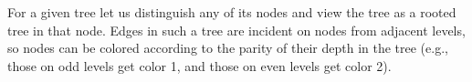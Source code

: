 \subproblem
For a given tree let us distinguish any of its nodes and view the tree as a rooted tree in that node.
Edges in such a tree are incident on nodes from adjacent levels, so nodes can be colored according to the parity of their depth in the tree (e.g., those on odd levels get color 1, and those on even levels get color 2).
